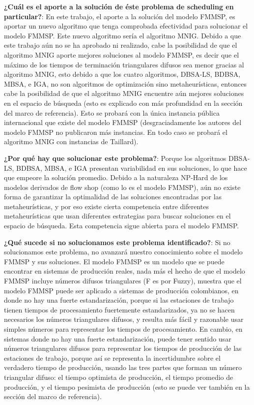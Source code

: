 \documentclass{article}
\begin{document}
\vspace{\baselineskip}
\textbf{¿Cuál es el aporte a la solución de éste problema de scheduling en particular?}: En este trabajo, el aporte a la solución del modelo FMMSP, es aportar un nuevo algoritmo que tenga comprobada efectividad para solucionar el modelo FMMSP. Este nuevo algoritmo sería el algoritmo MNIG. Debido a que este trabajo aún no se ha aprobado ni realizado, cabe la posibilidad de que el algoritmo MNIG aporte mejores soluciones al modelo FMMSP, es decir que el máximo de los tiempos de terminación triangulares difusos sea menor gracias al algoritmo MNIG, esto debido a que los cuatro algoritmos, DBSA-LS, BDBSA, MBSA, e IGA, no son algoritmos de optimización sino metaheurísticas, entonces cabe la posibilidad de que el algoritmo MNIG encuentre aún mejores soluciones en el espacio de búsqueda (esto es explicado con más profundidad en la sección del marco de referencia). Esto se probará con la única instancia pública internacional que existe del modelo FMMSP (desgraciadamente los autores del modelo FMMSP no publicaron más instancias. En todo caso se probará el algoritmo MNIG con instancias de Taillard).

\vspace{\baselineskip}
\textbf{¿Por qué hay que solucionar este problema?}: Porque los algoritmos DBSA-LS, BDBSA, MBSA, e IGA presentan variabilidad en sus soluciones, lo que hace que empeore la solución promedio. Debido a la naturaleza NP-Hard de los modelos derivados de flow shop (como lo es el modelo FMMSP), aún no existe forma de garantizar la optimalidad de las soluciones encontradas por las metaheurísticas, y por eso existe cierta competencia entre diferentes metaheurísticas que usan diferentes estrategias para buscar soluciones en el espacio de búsqueda. Esta competencia sigue abierta para el modelo FMMSP.

\vspace{\baselineskip}
\textbf{¿Qué sucede si no solucionamos este problema identificado?}: Si no solucionamos este problema, no avanzará nuestro conocimiento sobre el modelo FMMSP y sus soluciones. El modelo FMMSP es un modelo que se puede encontrar en sistemas de producción reales, nada más el hecho de que el modelo FMMSP incluye números difusos triangulares (F es por Fuzzy), muestra que el modelo FMMSP puede ser aplicado a sistemas de producción colombianos, en donde no hay una fuerte estandarización, porque si las estaciones de trabajo tienen tiempos de procesamiento fuertemente estandarizados, ya no se hacen necesarios los números triangulares difusos, y resulta más fácil y razonable usar simples números para representar los tiempos de procesamiento. En cambio, en sistemas donde no hay una fuerte estandarización, puede tener sentido usar números triangulares difusos para representar los tiempos de producción de las estaciones de trabajo, porque así se representa la incertidumbre sobre el verdadero tiempo de producción, usando las tres partes que forman un número triangular difuso: el tiempo optimista de producción, el tiempo promedio de producción, y el tiempo pesimista de producción (esto se puede ver también en la sección del marco de referencia).
\end{document}
